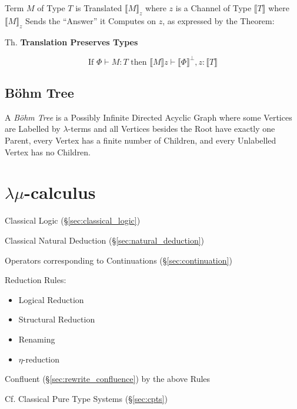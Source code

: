Term $M$ of Type $T$ is Translated $\llbracket M \rrbracket_z$ where
$z$ is a Channel of Type $\llbracket T \rrbracket$ where $\llbracket M
\rrbracket_z$ Sends the ``Answer'' it Computes on $z$, as expressed by
the Theorem:

Th. \textbf{Translation Preserves Types}

\[
  \text{If } \Phi \vdash M : T \text{ then }
  \llbracket M \rrbracket z \vdash \llbracket \Phi \rrbracket^\bot,
  z : \llbracket T \rrbracket
\]



\subsection{B\"ohm Tree}\label{sec:bohm_tree}

A \emph{B\"ohm Tree} is a Possibly Infinite Directed Acyclic Graph
where some Vertices are Labelled by $\lambda$-terms and all Vertices
besides the Root have exactly one Parent, every Vertex has a finite
number of Children, and every Unlabelled Vertex has no Children.



\section{$\lambda\mu$-calculus}\label{sec:lambda_mu}

Classical Logic (\S\ref{sec:classical_logic})

Classical Natural Deduction (\S\ref{sec:natural_deduction})

Operators corresponding to Continuations (\S\ref{sec:continuation})

Reduction Rules:
\begin{itemize}
  \item Logical Reduction
  \item Structural Reduction
  \item Renaming
  \item $\eta$-reduction
\end{itemize}

Confluent (\S\ref{sec:rewrite_confluence}) by the above Rules

\fist Cf. Classical Pure Type Systems (\S\ref{sec:cpts})



